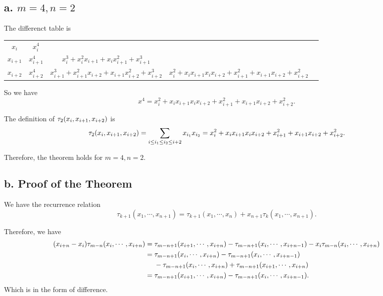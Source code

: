\documentclass[a4paper]{article}
\begin{document}
\subsection*{a. $m=4,n=2$}

The differenct table is 
\begin{table}[H]
    \centering  
    \begin{tabular}{c|cccc}
    $x_i$  & $x_i^4$ &    & \\
    $x_{i+1}$  & $x_{i+1}^4$ & $x_i^3+x_i^2 x_{i+1}+x_i x_{i+1}^2+x_{i+1}^3$  & \\
    $x_{i+2}$  & $x_{i+2}^4$ & $x_{i+1}^3+x_{i+1}^2 x_{i+2}+x_{i+1} x_{i+2}^2+x_{i+2}^3$ & $x_i^2+x_ix_{i+1}x_ix_{i+2}+x_{i+1}^2+x_{i+1}x_{i+2}+x_{i+2}^2$ \\
    \end{tabular}
\end{table} 

So we have 
\begin{equation}
    [x_i,x_{i+1},x_{i+2}]x^4 = x_i^2+x_ix_{i+1}x_ix_{i+2}+x_{i+1}^2+x_{i+1}x_{i+2}+x_{i+2}^2.
\end{equation}

The definition of $\tau_2 \qty(x_i,x_{i+1},x_{i+2})$ is 
\begin{equation}
    \tau_2 \qty(x_i,x_{i+1},x_{i+2}) = \sum_{i \leq i_1 \leq i_2 \leq i+2} x_{i_1} x_{i_2} = x_i^2+x_ix_{i+1}x_ix_{i+2}+x_{i+1}^2+x_{i+1}x_{i+2}+x_{i+2}^2.
\end{equation}

Therefore, the theorem holds for $m=4,n=2$.

\subsection*{b. Proof of the Theorem}

We have the recurrence relation
\begin{equation}
    \tau_{k+1} (x_1, \cdots, x_{n+1}) = \tau_{k+1} (x_1, \cdots, x_{n}) + x_{n+1} \tau_k (x_1, \cdots, x_{n+1}).
\end{equation}

Therefore, we have
\begin{equation}
    \begin{aligned}
        \qty(x_{i+n}-x_i)\tau_{m-n} \qty(x_i,\cdots,x_{i+n}) &= \tau_{m-n+1}  (x_{i+1}, \cdots, x_{i+n}) - \tau_{m-n+1}  (x_{i}, \cdots, x_{i+n-1}) - x_i \tau_{m-n} \qty(x_i,\cdots,x_{i+n}) \\
        &=  \tau_{m-n+1}  (x_{i}, \cdots, x_{i+n}) - \tau_{m-n+1}  (x_{i}, \cdots, x_{i+n-1}) \\
        &~~~~ - \tau_{m-n+1}  (x_{i}, \cdots, x_{i+n}) + \tau_{m-n+1}  (x_{i+1}, \cdots, x_{i+n}) \\
        &= \tau_{m-n+1}  (x_{i+1}, \cdots, x_{i+n}) - \tau_{m-n+1}  (x_{i}, \cdots, x_{i+n-1}). 
    \end{aligned}
\end{equation}
Which is in the form of difference. 
\end{document}
